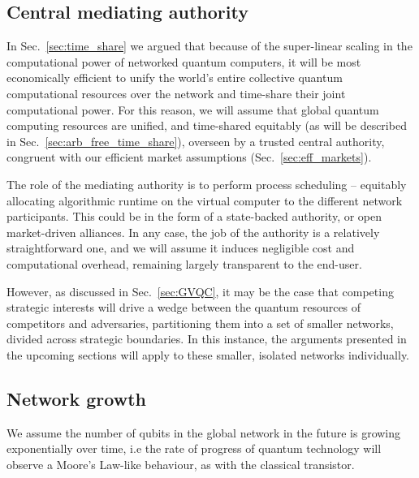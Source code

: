 \subsection{Central mediating authority}

In Sec.~\ref{sec:time_share} we argued that because of the super-linear scaling in the computational power of networked quantum computers, it will be most economically efficient to unify the world's entire collective quantum computational resources over the network and time-share their joint computational power. For this reason, we will assume that global quantum computing resources are unified, and time-shared equitably (as will be described in Sec.~\ref{sec:arb_free_time_share}), overseen by a trusted central authority, congruent with our efficient market assumptions (Sec.~\ref{sec:eff_markets}).

The role of the mediating authority is to perform process scheduling -- equitably allocating algorithmic runtime on the virtual computer to the different network participants. This could be in the form of a state-backed authority, or open market-driven alliances. In any case, the job of the authority is a relatively straightforward one, and we will assume it induces negligible cost and computational overhead, remaining largely transparent to the end-user.

However, as discussed in Sec.~\ref{sec:GVQC}, it may be the case that competing strategic interests will drive a wedge between the quantum resources of competitors and adversaries, partitioning them into a set of smaller networks, divided across strategic boundaries. In this instance, the arguments presented in the upcoming sections will apply to these smaller, isolated networks individually.

%
%

\subsection{Network growth} 

We assume the number of qubits in the global network in the future is growing exponentially over time, i.e the rate of progress of quantum technology will observe a Moore's Law-like behaviour, as with the classical transistor.

